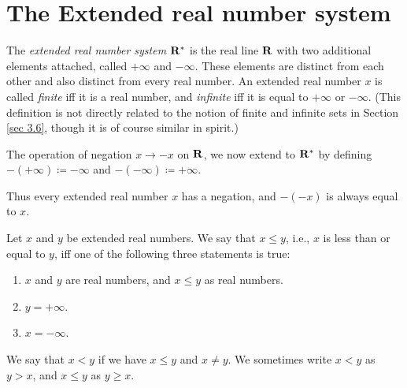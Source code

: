 \section{The Extended real number system}\label{sec 6.2}

\begin{definition}\label{6.2.1}
    The \emph{extended real number system \(\mathbf{R}^*\)} is the real line \(\mathbf{R}\) with two additional elements attached, called \(+\infty\) and \(-\infty\).
    These elements are distinct from each other and also distinct from every real number.
    An extended real number \(x\) is called \emph{finite} iff it is a real number, and \emph{infinite} iff it is equal to \(+\infty\) or \(-\infty\).
    (This definition is not directly related to the notion of finite and infinite sets in Section \ref{sec 3.6}, though it is of course similar in spirit.)
\end{definition}

\begin{definition}\label{6.2.2}
    The operation of negation \(x \to -x\) on \(\mathbf{R}\), we now extend to \(\mathbf{R}^*\) by defining \(-(+\infty) \coloneqq -\infty\) and \(-(-\infty) \coloneqq +\infty\).
\end{definition}

\begin{note}
    Thus every extended real number \(x\) has a negation, and \(-(-x)\) is always equal to \(x\).
\end{note}

\begin{definition}\label{6.2.3}
    Let \(x\) and \(y\) be extended real numbers.
    We say that \(x \leq y\), i.e., \(x\) is less than or equal to \(y\), iff one of the following three statements is true:
    \begin{enumerate}
        \item \(x\) and \(y\) are real numbers, and \(x \leq y\) as real numbers.
        \item \(y = +\infty\).
        \item \(x = -\infty\).
    \end{enumerate}
    We say that \(x < y\) if we have \(x \leq y\) and \(x \neq y\).
    We sometimes write \(x < y\) as \(y > x\), and \(x \leq y\) as \(y \geq x\).
\end{definition}

